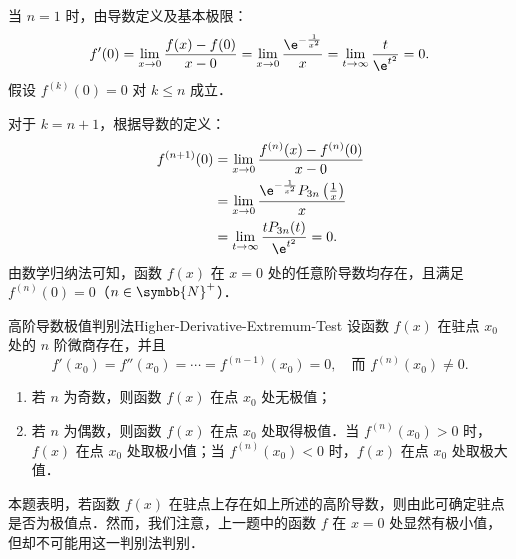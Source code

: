 \begin{myproof}
    当 $n = 1$ 时，由导数定义及基本极限：
    \begin{equation}
        f'(0) = \lim_{x\to 0} \frac{f(x) - f(0)}{x - 0} = \lim_{x\to 0} \frac{\e^{-\frac{1}{x^2}}}{x} = \lim_{t\to\infty} \frac{t}{\e^{t^2}} = 0.
    \end{equation}
    假设 $f^{(k)}(0) = 0$ 对 $k \leqslant n$ 成立．

    对于 $k = n + 1$，根据导数的定义：
    \begin{equation}
        \begin{aligned}
            f^{(n+1)}(0) & = \lim_{x\to 0} \frac{f^{(n)}(x) - f^{(n)}(0)}{x - 0}                        \\
                         & = \lim_{x\to 0} \frac{\e^{-\frac{1}{x^2}} P_{3n}\left(\frac{1}{x}\right)}{x} \\
                         & = \lim_{t\to\infty} \frac{t P_{3n}(t)}{\e^{t^2}} = 0.
        \end{aligned}
    \end{equation}
    由数学归纳法可知，函数 $f(x)$ 在 $x = 0$ 处的任意阶导数均存在，且满足 $f^{(n)}(0) = 0$（$n \in \symbb{N}^+$）．
\end{myproof}

\begin{problem}{高阶导数极值判别法}{Higher-Derivative-Extremum-Test}
    设函数 $f(x)$ 在驻点 $x_0$ 处的 $n$ 阶微商存在，并且
    \begin{equation}
        f'(x_0) = f''(x_0) = \cdots = f^{(n-1)}(x_0) = 0, \quad \text{而 } f^{(n)}(x_0) \neq 0.
    \end{equation}
    \begin{enumerate}
        \item 若 $n$ 为奇数，则函数 $f(x)$ 在点 $x_0$ 处无极值；
        \item 若 $n$ 为偶数，则函数 $f(x)$ 在点 $x_0$ 处取得极值．当 $f^{(n)}(x_0) > 0$ 时，$f(x)$ 在点 $x_0$ 处取极小值；当 $f^{(n)}(x_0) < 0$ 时，$f(x)$ 在点 $x_0$ 处取极大值．
    \end{enumerate}
    本题表明，若函数 $f(x)$ 在驻点上存在如上所述的高阶导数，则由此可确定驻点是否为极值点．然而，我们注意，上一题中的函数 $f$ 在 $x = 0$ 处显然有极小值，但却不可能用这一判别法判别．
\end{problem}

